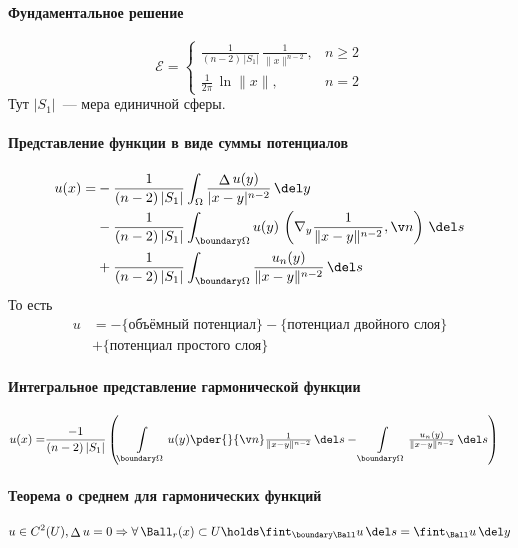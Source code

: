 \documentclass[exam]{trchesh}
\newcommand{\laplop}{\mathop{\Delta}}
\begin{document}
\paragraph{Фундаментальное решение}
\[
  \mathcal E = \begin{cases}
    \frac{1}{(n-2)\, |S_1|}\, \frac{1}{\|x\|^{n-2}}, & n \geqslant 2 \\[1em]
    \tfrac{1}{2\pi}\, \ln\|x\|, & n = 2
  \end{cases}
\]
Тут $|S_1|$~--- мера единичной сферы.

\paragraph{Представление функции в виде суммы потенциалов}
\[
  \begin{split} 
    u(x) = &- \frac{1}{(n-2)\,|S_1|} \int_\Omega \frac{\laplop u(y)}{|x-y|^{n-2}} \, \del y \\
           &- \frac{1}{(n-2)\,|S_1|} \int_{\boundary \Omega} u(y)\, 
              \left(\nabla_y\frac{1}{\|x-y\|^{n-2}}, \v n\right) \, \del s          \\
           &+ \frac{1}{(n-2)\,|S_1|} \int_{\boundary \Omega} \frac{u_n(y)}{\|x-y\|^{n-2}}\,\del s
  \end{split}
\]
То есть
\[
  \begin{split}
    u &= -\{\text{объёмный потенциал}\} - \{\text{потенциал двойного слоя}\} \\
      &+ \{\text{потенциал простого слоя}\}
  \end{split}
\]

\paragraph{Интегральное представление гармонической функции}
\[
  \begin{split} 
    u(x) = &\frac{-1}{(n-2)\,|S_1|} \left(
      \int\limits_{\boundary \Omega} u(y) {\textstyle\pder{}{\v n}\frac{1}{\|x-y\|^{n-2}}}\,\del s - 
      \int\limits_{\boundary \Omega} \tfrac{u_n(y)}{\|x-y\|^{n-2}}\,\del s
    \right)
  \end{split}
\]

\paragraph{Теорема о среднем для гармонических функций}
\[
  u\in C^2(U),\laplop u = 0 \Rightarrow \forall\, \Ball_{r}(x) \subset U \holds  \fint_{\boundary \Ball} u\, \del s
  = \fint_{\Ball} u \, \del y
\]
\end{document}
